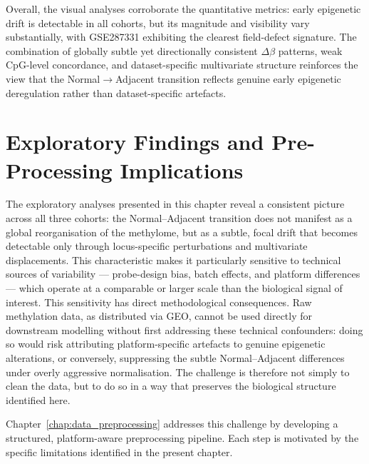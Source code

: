 Overall, the visual analyses corroborate the quantitative metrics: early 
epigenetic drift is detectable in all cohorts, but its magnitude and 
visibility vary substantially, with GSE287331 exhibiting the clearest 
field-defect signature.  
The combination of globally subtle yet directionally consistent 
$\Delta\beta$ patterns, weak CpG-level concordance, and 
dataset-specific multivariate structure reinforces the view that the 
Normal$\rightarrow$Adjacent transition reflects genuine early 
epigenetic deregulation rather than dataset-specific artefacts.

\section{Exploratory Findings and Pre-Processing Implications}
\label{sec:cap3_conclusions}

The exploratory analyses presented in this chapter reveal a consistent picture 
across all three cohorts: the Normal--Adjacent transition does not manifest as a 
global reorganisation of the methylome, but as a subtle, focal drift that becomes 
detectable only through locus-specific perturbations and multivariate 
displacements. This characteristic makes it particularly sensitive to technical 
sources of variability --- probe-design bias, batch effects, and platform 
differences --- which operate at a comparable or larger scale than the biological 
signal of interest.
This sensitivity has direct methodological consequences. Raw methylation data, 
as distributed via GEO, cannot be used directly for downstream modelling without 
first addressing these technical confounders: doing so would risk attributing 
platform-specific artefacts to genuine epigenetic alterations, or conversely, 
suppressing the subtle Normal--Adjacent differences under overly aggressive 
normalisation. The challenge is therefore not simply to clean the data, but to do 
so in a way that preserves the biological structure identified here.

Chapter~\ref{chap:data_preprocessing} addresses this challenge by developing a structured, platform-aware 
preprocessing pipeline. Each step is motivated by the specific limitations 
identified in the present chapter.